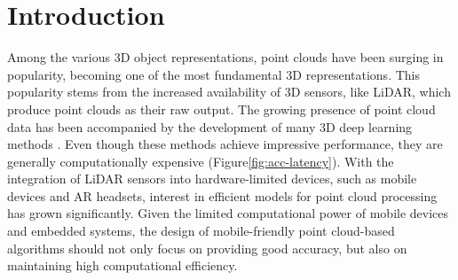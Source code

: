 \documentclass{article}
\newcommand{\figLabel}{Figure\xspace}
\begin{document}
 \section{Introduction}
Among the various 3D object representations, point clouds have been surging in popularity, becoming one of the most fundamental 3D representations. This popularity stems from the increased availability of 3D sensors, like LiDAR, which produce point clouds as their raw output. The growing presence of point cloud data has been accompanied by the development of many 3D deep learning methods \cite{Qi2017PointNetDH, dgcnn, Li2019DeepGCNs, Thomas2019KPConvFA, Liu2020ACL}. Even though these methods achieve impressive performance, they are generally computationally expensive (\figLabel \ref{fig:acc-latency}). With the integration of LiDAR sensors into hardware-limited devices, such as mobile devices and AR headsets, interest in efficient models for point cloud processing has grown significantly. Given the limited computational power of mobile devices and embedded systems, the design of mobile-friendly point cloud-based algorithms should not only focus on providing good accuracy, but also on maintaining high computational efficiency.
\end{document}
